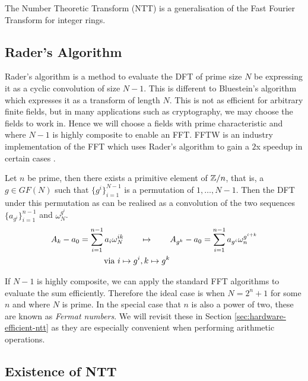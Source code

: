 The Number Theoretic Transform (NTT) is a generalisation of the Fast Fourier Transform for integer rings.

\subsection{Rader's Algorithm}
\label{subsec:rt}

Rader's algorithm is a method to evaluate the DFT of prime size $N$ be expressing it as a cyclic convolution of size $N - 1$. This is different to Bluestein's algorithm which expresses it as a transform of length $N$. This is not as efficient for arbitrary finite fields, but in many applications such as cryptography, we may choose the fields to work in. Hence we will choose a fields with prime characteristic and where $N - 1$ is highly composite to enable an FFT. FFTW is an industry implementation of the FFT which uses Rader's algorithm to gain a $2$x speedup in certain cases \cite{fftw}.

\begin{definition}\label{thm:rader-transform}
    Let $n$ be prime, then there exists a primitive element of ${\mathbb Z}/n$, that is, a $g \in GF(N)$ such that $\{g^i\}_{i=1}^{N-1}$ is a permutation of $1, \ldots, N-1$. Then the DFT under this permutation as can be realised as a convolution of the two sequences $\{a_{g^i}\}_{i=1}^{n-1}$ and $\omega_N^{g^i}$.
    \begin{align*}
        A_k - a_0 = \sum^{n-1}_{i=1} a_i \omega_N^{ik} \qquad &\mapsto \qquad A_{g^k} - a_0 = \sum^{n-1}_{i=1} a_{g^i}\omega_n^{g^{i+k}}\\
        \textrm{ via } i \mapsto g^i&, k \mapsto g^k
    \end{align*}
\end{definition}

If $N - 1$ is highly composite, we can apply the standard FFT algorithms to evaluate the sum efficiently. Therefore the ideal case is when $N = 2^n + 1$ for some $n$ and where $N$ is prime. In the special case that $n$ is also a power of two, these are known as \emph{Fermat numbers}. We will revisit these in Section \ref{sec:hardware-efficient-ntt} as they are especially convenient when performing arithmetic operations.

\subsection{Existence of NTT}%
\label{sub:Existence of NTT}

